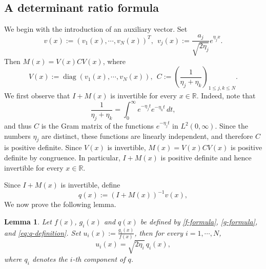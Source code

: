 \documentclass[11pt]{article}
\numberwithin{equation}{section}
\newtheorem{lemma}[theorem]{Lemma}
\theoremstyle{definition}
\begin{document}
\subsection{A determinant ratio formula}




We begin with the introduction of an auxiliary vector.
Set
\begin{equation}\label{vvect}
	v(x):=
	\left(
	v_1(x),\cdots,v_N(x)
	\right)^T,
	\ \
	v_j(x):=\frac{a_j}{\sqrt{2\eta_j}}e^{\eta_jx}.
\end{equation}
Then $M(x)=V(x)C V(x)$, where
\begin{equation}\label{Vm}
	V(x):=\operatorname{diag}(v_1(x),\cdots,v_N(x)),
	\ \
	C:=\left(\frac{1}{\eta_j+\eta_k}\right)_{1\le j,k\le N}.
\end{equation}
We first observe that \(I+M(x)\) is invertible for every \(x\in\mathbb R\).
Indeed,
note that
\[
\frac1{\eta_j+\eta_k}
=
\int_0^\infty e^{-\eta_jt}e^{-\eta_kt}\,dt,
\]
and thus \(C\) is the Gram matrix of the functions
\(e^{-\eta_jt}\) in \(L^2(0,\infty)\). Since the numbers
\(\eta_j\) are distinct, these functions are linearly independent, and
therefore \(C\) is positive definite. Since \(V(x)\) is invertible, \(M(x)=V(x)CV(x)\) is positive definite by
congruence. In particular, \(I+M(x)\) is positive definite and hence
invertible for every \(x\in\mathbb R\).

Since $I+M(x)$ is invertible,  define
\begin{equation}\label{eq:q-definition}
q(x):=(I+M(x))^{-1}v(x),
\end{equation}
We now prove the following lemma.


\begin{lemma}\label{lem:ratio-formula}
Let \(f(x)\), \(g_i(x)\)  and \(q(x)\) be defined by
\eqref{f-formula}, \eqref{g-formula}, and \eqref{eq:q-definition}.  Set $u_i(x):=\frac{g_i(x)}{f(x)}$, then for every
\(i=1,\cdots,N\),
\[
u_i(x)=
\sqrt{2\eta_i}\,q_i(x),
\]
where \(q_i\) denotes the \(i\)-th component of \(q\).
\end{lemma}
\end{document}

